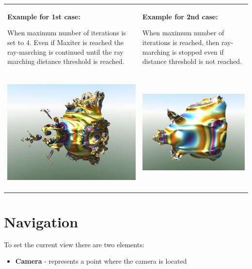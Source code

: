\begin{longtable}[]{@{}ll@{}}
\toprule
\textbf{Example for 1st case:}

When maximum number of iterations is set to 4. Even if Maxiter is
reached the ray-marching is continued until the ray marching distance
threshold is reached. & \textbf{Example for 2nd case:}

When maximum number of iterations is reached, then ray-marching is
stopped even if distance threshold is not reached.\tabularnewline
\includegraphics[width=3.26929in,height=2.44016in]{img/manual/media/image10.png}
&
\includegraphics[width=3.26890in,height=2.44016in]{img/manual/media/image11.png}\tabularnewline
\bottomrule
\end{longtable}

\hypertarget{navigation}{\section{Navigation}\label{navigation}}

To set the current view there are two elements:

\begin{itemize}
\item
  \textbf{Camera} - represents a point where the camera is located
\end{itemize}


